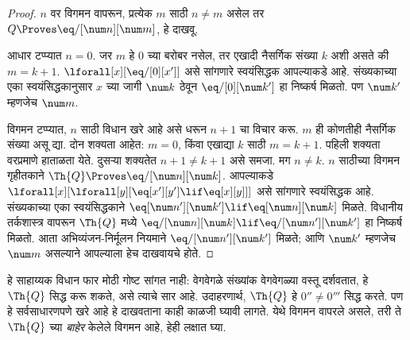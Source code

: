 \begin{proof}
$n$ वर विगमन वापरून, प्रत्येक $m$ साठी $n \neq m$ असेल तर
$Q \Proves \eq/[\num n][\num m]$, हे दाखवू.

आधार टप्प्यात $n = 0$. जर $m$ हे $0$ च्या बरोबर नसेल,
तर एखादी नैसर्गिक संख्या $k$ अशी असते की $m = k +
1$. $\lforall[x][\eq/[0][x']]$ असे सांगणारे स्वयंसिद्धक
आपल्याकडे आहे. संख्यकाच्या एका स्वयंसिद्धकानुसार $x$ च्या जागी
$\num k$ ठेवून $\eq/[0][\num k']$ हा निष्कर्ष मिळतो. पण
$\num k'$ म्हणजेच $\num m$.

विगमन टप्प्यात, $n$ साठी विधान खरे आहे असे धरून $n+1$ चा
विचार करू. $m$ ही कोणतीही नैसर्गिक संख्या असू द्या. दोन शक्यता
आहेत: $m = 0$, किंवा एखाद्या $k$ साठी $m = k+1$. पहिली
शक्यता वरप्रमाणे हाताळता येते. दुसऱ्या शक्यतेत $n+1 \neq
k+1$ असे समजा. मग $n \neq k$. $n$ साठीच्या विगमन गृहीतकाने
$\Th{Q} \Proves \eq/[\num n][\num k]$. आपल्याकडे
$\lforall[x][\lforall[y][\eq[x'][y'] \lif \eq[x][y]]]$
असे सांगणारे स्वयंसिद्धक आहे. संख्यकाच्या एका स्वयंसिद्धकाने
$\eq[\num n'][\num k'] \lif \eq[\num n][\num
  k]$ मिळते. विधानीय तर्कशास्त्र वापरून $\Th{Q}$ मध्ये
$\eq/[\num n][\num k] \lif \eq/[\num n'][\num k']$
हा निष्कर्ष मिळतो. आता अभिव्यंजन-निर्मूलन नियमाने
$\eq/[\num n'][\num k']$ मिळते; आणि $\num k'$ म्हणजेच
$\num m$ असल्याने आपल्याला हेच दाखवायचे होते.
\end{proof}

\begin{explain}
हे साहाय्यक विधान फार मोठी गोष्ट सांगत नाही: वेगवेगळे संख्यांक
वेगवेगळ्या वस्तू दर्शवतात, हे $\Th{Q}$ सिद्ध करू शकते,
असे त्याचे सार आहे. उदाहरणार्थ, $\Th{Q}$ हे
$0'' \neq 0'''$ सिद्ध करते. पण हे सर्वसाधारणपणे खरे आहे
हे दाखवताना काही काळजी घ्यावी लागते. येथे विगमन वापरले असले,
तरी ते $\Th{Q}$ च्या \emph{बाहेर} केलेले विगमन आहे, हेही लक्षात घ्या.
\end{explain}

